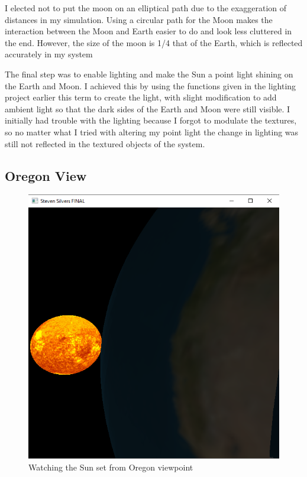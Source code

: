 \documentclass[12pt,serif,draftclsnofoot,onecolumn]{IEEEtran}
\begin{document}
	\newline
			I elected not to put the moon on an elliptical path due to the exaggeration of distances in my simulation. Using a circular path for the Moon makes the interaction between the Moon and Earth easier to do and look less cluttered in the end. However, the size of the moon is 1/4 that of the Earth, which is reflected accurately in my system
	\newline
	\par
			The final step was to enable lighting and make the Sun a point light shining on the Earth and Moon. I achieved this by using the functions given in the lighting project earlier this term to create the light, with slight modification to add ambient light so that the dark sides of the Earth and Moon were still visible. I initially had trouble with the lighting because I forgot to modulate the textures, so no matter what I tried with altering my point light the change in lighting was still not reflected in the textured objects of the system.
	\newline
	\subsection{Oregon View}
	\par
			
	
	\begin{figure}[h]
		\includegraphics[scale=.67]{cap2}
		\caption{Watching the Sun set from Oregon viewpoint}
	\end{figure}
\end{document}
